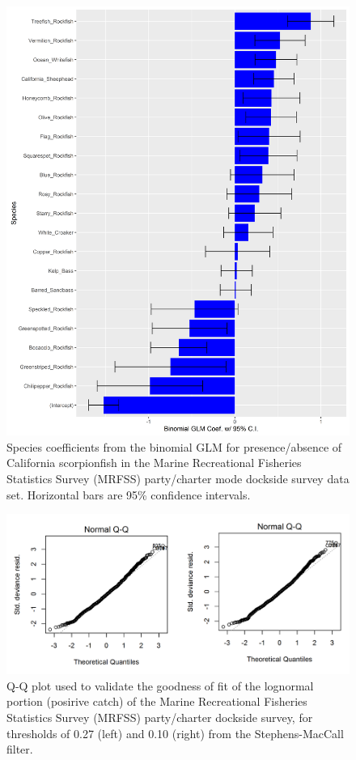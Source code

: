\documentclass[12pt,]{article}
\begin{document}
\begin{figure}[htbp]
\centering
\includegraphics{Figures/Fleet5_RecPC_dockside_SM.png}
\caption{Species coefficients from the binomial GLM for presence/absence
of California scorpionfish in the Marine Recreational Fisheries
Statistics Survey (MRFSS) party/charter mode dockside survey data set.
Horizontal bars are 95\% confidence intervals.
\label{fig:Fleet5_RecPC_docksideSM}}
\end{figure}

\begin{figure}[htbp]
\centering
\includegraphics{Figures/Fleet5_RecPC_dockside_QQ.png}
\caption{Q-Q plot used to validate the goodness of fit of the lognormal
portion (posirive catch) of the Marine Recreational Fisheries Statistics
Survey (MRFSS) party/charter dockside survey, for thresholds of 0.27
(left) and 0.10 (right) from the Stephens-MacCall filter.
\label{fig:Fleet5_RecPC_docksideQQ}}
\end{figure}
\end{document}
